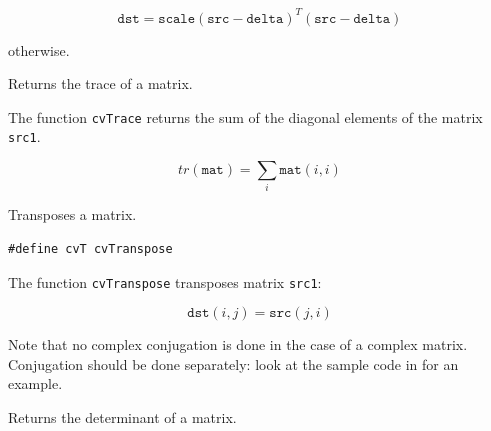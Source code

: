 \[
\texttt{dst}=\texttt{scale} (\texttt{src}-\texttt{delta})^T (\texttt{src}-\texttt{delta})
\]

otherwise.

\label{Trace}

Returns the trace of a matrix.


\begin{description}
\end{description}


The function \texttt{cvTrace} returns the sum of the diagonal elements of the matrix \texttt{src1}.

\[ tr(\texttt{mat}) = \sum_i \texttt{mat}(i,i) \]

\label{Transpose}

Transposes a matrix.


\begin{lstlisting}
#define cvT cvTranspose
\end{lstlisting}

\begin{description}
\end{description}

The function \texttt{cvTranspose} transposes matrix \texttt{src1}:

\[ \texttt{dst}(i,j) = \texttt{src}(j,i) \]

Note that no complex conjugation is done in the case of a complex
matrix. Conjugation should be done separately: look at the sample code
in  for an example.

\label{Det}

Returns the determinant of a matrix.


\begin{description}
\end{description}

